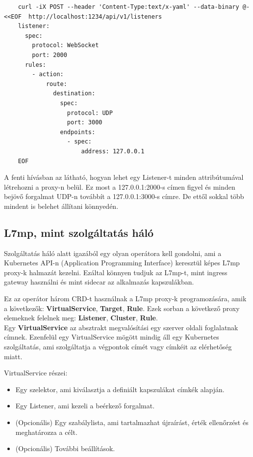 \begin{lstlisting}
	curl -iX POST --header 'Content-Type:text/x-yaml' --data-binary @- <<EOF  http://localhost:1234/api/v1/listeners
	listener:
	  spec:
	    protocol: WebSocket
	    port: 2000
	  rules:
	    - action:
	        route:
	          destination:
	            spec:
  	              protocol: UDP
	              port: 3000
	            endpoints:
	              - spec:
	                  address: 127.0.0.1
	EOF
\end{lstlisting}

A fenti hívásban az látható, hogyan lehet egy Listener-t minden attribútumával 
létrehozni a proxy-n belül. Ez most a 127.0.0.1:2000-s címen figyel és minden 
bejövő forgalmat UDP-n továbbít a 127.0.0.1:3000-s címre. De ettől sokkal több
mindent is belehet állítani könnyedén. 

\subsection{L7mp, mint szolgáltatás háló}

Szolgáltatás háló alatt igazából egy olyan operátora kell gondolni, ami a Kubernetes
API-n (Application Programming Interface) keresztül képes L7mp proxy-k halmazát 
kezelni. Ezáltal könnyen tudjuk az L7mp-t, mint ingress gateway használni és 
mint sidecar az alkalmazás kapszulákban.

Ez az operátor három CRD-t használnak a L7mp proxy-k programozására, amik a következők:
\textbf{VirtualService}, \textbf{Target}, \textbf{Rule}. Ezek sorban a következő proxy 
elemeknek felelnek meg: \textbf{Listener}, \textbf{Cluster}, \textbf{Rule}. \\ 

Egy \textbf{VirtualService} az absztrakt megvalósítási egy szerver oldali foglalatnak címnek. 
Ezenfelül egy VirtualService mögött mindig áll egy Kubernetes szolgáltatás, ami 
szolgáltatja a végpontok címét vagy címkéit az elérhetőség miatt.

VirtualService részei: 

\begin{itemize}
	\item Egy szelektor, ami kiválasztja a definiált kapszulákat címkék alapján.
	\item Egy Listener, ami kezeli a beérkező forgalmat. 
	\item (Opcionális) Egy szabálylista, ami tartalmazhat újraírást, érték ellenőrzést
	és meghatározza a célt. 
	\item (Opcionális) További beállítások.  
\end{itemize}

